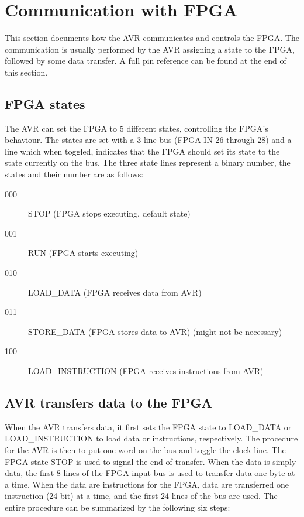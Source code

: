 \section{Communication with FPGA}
\label{sec:avr-fpga-communication}

This section documents how the AVR communicates and controls the FPGA. The communication is usually performed by the AVR assigning a state to the FPGA, followed by some data transfer. A full pin reference can be found at the end of this section.

\subsection{FPGA states}

The AVR can set the FPGA to 5 different states, controlling the FPGA's behaviour. The states are set with a 3-line bus (FPGA IN 26 through 28) and a line which when toggled, indicates that the FPGA should set its state to the state currently on the bus. The three state lines represent a binary number, the states and their number are as follows:

\begin{description}
\item[000] STOP (FPGA stops executing, default state) 
\item[001] RUN (FPGA starts executing) 
\item[010] LOAD\_DATA (FPGA receives data from AVR) 
\item[011] STORE\_DATA (FPGA stores data to AVR) (might not be necessary) 
\item[100] LOAD\_INSTRUCTION (FPGA receives instructions from AVR) 
\end{description}


\subsection{AVR transfers data to the FPGA}

When the AVR transfers data, it first sets the FPGA state to LOAD\_DATA or LOAD\_INSTRUCTION to load data or instructions, respectively. The procedure for the AVR is then to put one word on the bus and toggle the clock line. The FPGA state STOP is used to signal the end of transfer. When the data is simply data, the first 8 lines of the FPGA input bus is used to transfer data one byte at a time. When the data are instructions for the FPGA, data are transferred one instruction (24 bit) at a time, and the first 24 lines of the bus are used. The entire procedure can be summarized by the following six steps:

